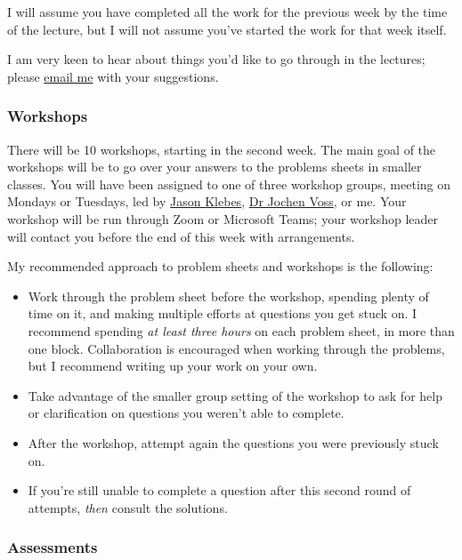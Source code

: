 \documentclass[
  a4paper,
]{article}
\providecommand{\tightlist}{%
  \setlength{\itemsep}{0pt}\setlength{\parskip}{0pt}}
\theoremstyle{definition}
\theoremstyle{definition}
\theoremstyle{definition}
\theoremstyle{remark}
\begin{document}
I will assume you have completed all the work for the previous week by the time of the lecture, but I will not assume you've started the work for that week itself.

I am very keen to hear about things you'd like to go through in the lectures; please \href{mailto:m.aldridge@leeds.ac.uk}{email me} with your suggestions.

\hypertarget{workshops}{%
\subsubsection*{Workshops}\label{workshops}}

There will be 10 workshops, starting in the second week. The main goal of the workshops will be to go over your answers to the problems sheets in smaller classes. You will have been assigned to one of three workshop groups, meeting on Mondays or Tuesdays, led by \href{https://eps.leeds.ac.uk/maths/pgr/8790/jason-klebes}{Jason Klebes}, \href{http://www1.maths.leeds.ac.uk/~voss/}{Dr Jochen Voss}, or me. Your workshop will be run through Zoom or Microsoft Teams; your workshop leader will contact you before the end of this week with arrangements.

My recommended approach to problem sheets and workshops is the following:

\begin{itemize}
\tightlist
\item
  Work through the problem sheet before the workshop, spending plenty of time on it, and making multiple efforts at questions you get stuck on. I recommend spending \emph{at least three hours} on each problem sheet, in more than one block. Collaboration is encouraged when working through the problems, but I recommend writing up your work on your own.
\item
  Take advantage of the smaller group setting of the workshop to ask for help or clarification on questions you weren't able to complete.
\item
  After the workshop, attempt again the questions you were previously stuck on.
\item
  If you're still unable to complete a question after this second round of attempts, \emph{then} consult the solutions.
\end{itemize}

\hypertarget{assessments}{%
\subsubsection*{Assessments}\label{assessments}}
\end{document}
